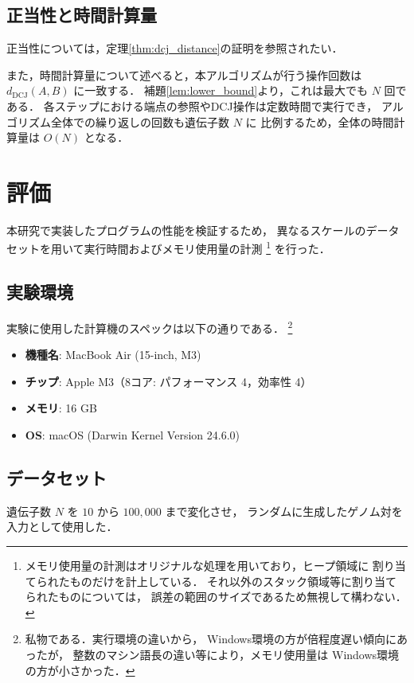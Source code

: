 \documentclass[paper=a4,fontsize=11pt,report,oneside]{jlreq}
\begin{document}
\section{正当性と時間計算量}

正当性については，定理\ref{thm:dcj_distance}の証明を参照されたい．

また，時間計算量について述べると，本アルゴリズムが行う操作回数は
$d_{\mathrm{DCJ}}(A, B)$ に一致する．
補題\ref{lem:lower_bound}より，これは最大でも $N$ 回である．
各ステップにおける端点の参照やDCJ操作は定数時間で実行でき，
アルゴリズム全体での繰り返しの回数も遺伝子数 $N$ に
比例するため，全体の時間計算量は $O(N)$ となる．



\chapter{評価}

本研究で実装したプログラムの性能を検証するため，
異なるスケールのデータセットを用いて実行時間およびメモリ使用量の計測
\footnote{
    メモリ使用量の計測はオリジナルな処理を用いており，ヒープ領域に
    割り当てられたものだけを計上している．
    それ以外のスタック領域等に割り当てられたものについては，
    誤差の範囲のサイズであるため無視して構わない．
}
を行った．

\section{実験環境}
実験に使用した計算機のスペックは以下の通りである．
\footnote{
    私物である．実行環境の違いから，
    Windows環境の方が倍程度遅い傾向にあったが，
    整数のマシン語長の違い等により，メモリ使用量は
    Windows環境の方が小さかった．
}
\begin{itemize}
    \item \textbf{機種名}: MacBook Air (15-inch, M3)
    \item \textbf{チップ}: Apple M3（8コア: パフォーマンス 4，効率性 4）
    \item \textbf{メモリ}: 16 GB
    \item \textbf{OS}: macOS (Darwin Kernel Version 24.6.0)
\end{itemize}

\section{データセット}
遺伝子数 $N$ を $10$ から $100,000$ まで変化させ，
ランダムに生成したゲノム対を入力として使用した．
\end{document}
